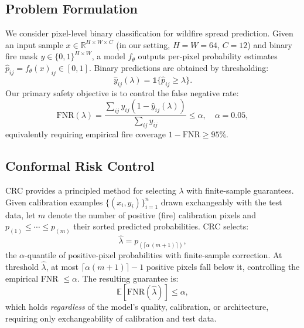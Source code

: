 \documentclass{article}
\begin{document}
\subsection{Problem Formulation}

We consider pixel-level binary classification for wildfire spread prediction.
Given an input sample $x \in \mathbb{R}^{H \times W \times C}$ (in our setting, $H{=}W{=}64$, $C{=}12$) and binary fire mask $y \in \{0,1\}^{H \times W}$, a model $f_\theta$ outputs per-pixel probability estimates $\hat{p}_{ij} = f_\theta(x)_{ij} \in [0,1]$.
Binary predictions are obtained by thresholding:
\begin{equation}
\hat{y}_{ij}(\lambda) = \mathbb{1}\{\hat{p}_{ij} \ge \lambda\}.
\end{equation}
Our primary safety objective is to control the false negative rate:
\begin{equation}
\mathrm{FNR}(\lambda) = \frac{\sum_{ij} y_{ij}(1 - \hat{y}_{ij}(\lambda))}{\sum_{ij} y_{ij}} \le \alpha, \quad \alpha = 0.05,
\label{eq:fnr}
\end{equation}
equivalently requiring empirical fire coverage $1 - \mathrm{FNR} \ge 95\%$.

\subsection{Conformal Risk Control}
\label{sec:crc-background}

CRC \citep{angelopoulos2022conformal} provides a principled method for selecting $\lambda$ with finite-sample guarantees.
Given calibration examples $\{(x_i, y_i)\}_{i=1}^{n}$ drawn exchangeably with the test data, let $m$ denote the number of positive (fire) calibration pixels and $p_{(1)} \le \cdots \le p_{(m)}$ their sorted predicted probabilities.  CRC selects:
\begin{equation}
\hat{\lambda} = p_{(\lceil \alpha\,(m+1) \rceil)},
\label{eq:crc}
\end{equation}
the $\alpha$-quantile of positive-pixel probabilities with finite-sample correction.
At threshold $\hat{\lambda}$, at most $\lceil \alpha(m{+}1) \rceil - 1$ positive pixels fall below it, controlling the empirical FNR $\le \alpha$.
The resulting guarantee is:
\begin{equation}
\mathbb{E}[\mathrm{FNR}(\hat{\lambda})] \le \alpha,
\label{eq:guarantee}
\end{equation}
which holds \emph{regardless} of the model's quality, calibration, or architecture, requiring only exchangeability of calibration and test data.
\end{document}
